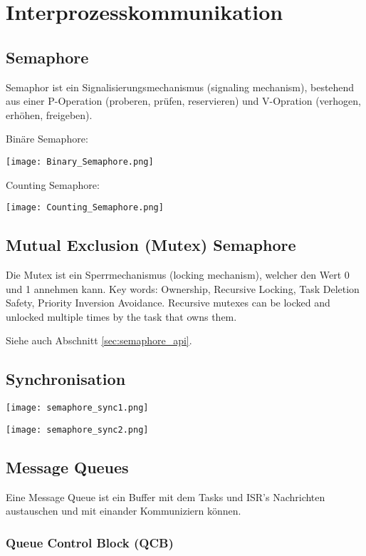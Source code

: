 \section{Interprozesskommunikation}

\subsection{Semaphore}

Semaphor ist ein Signalisierungsmechanismus (signaling mechanism), bestehend aus einer P-Operation (proberen, prüfen, reservieren) und V-Opration (verhogen, erhöhen, freigeben).

Binäre Semaphore:

\texttt{[image: Binary\_Semaphore.png]}

Counting Semaphore:

\texttt{[image: Counting\_Semaphore.png]}

\subsection{Mutual Exclusion (Mutex) Semaphore}

Die Mutex ist ein Sperrmechanismus (locking mechanism), welcher den Wert 0 und 1 annehmen kann.
Key words: Ownership, Recursive Locking, Task Deletion Safety, Priority Inversion Avoidance.
Recursive mutexes can be locked and unlocked multiple times by the task that owns them.

Siehe auch Abschnitt \ref{sec:semaphore_api}.


\subsection{Synchronisation}

\begin{center}
    \texttt{[image: semaphore\_sync1.png]}

    \texttt{[image: semaphore\_sync2.png]}
\end{center}


\subsection{Message Queues}

Eine Message Queue ist ein Buffer mit dem Tasks und ISR's Nachrichten austauschen und mit einander Kommuniziern können.

\subsubsection{Queue Control Block (QCB)}

